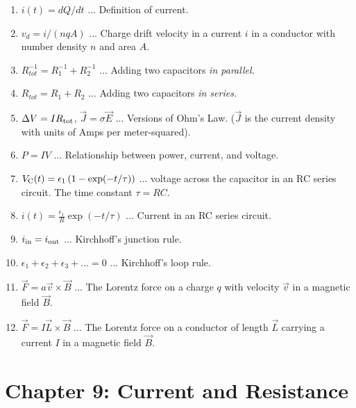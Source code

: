 \documentclass[10pt]{article}
\begin{document}
\begin{enumerate}
\item $i(t) = dQ/dt$ ... Definition of current.
\item $v_d = i/(nqA)$ ... Charge drift velocity in a current $i$ in a conductor with number density $n$ and area $A$.
\item $R_{tot}^{-1} = R_1^{-1} + R_2^{-1}$ ... Adding two capacitors \textit{in parallel.}
\item $R_{tot} = R_1 + R_2$ ... Adding two capacitors \textit{in series.}
\item $\Delta V = I R_{\rm tot}$, $\vec{J} = \sigma \vec{E}$ ... Versions of Ohm's Law. ($\vec{J}$ is the current density with units of Amps per meter-squared).
\item $P = I V$ ... Relationship between power, current, and voltage.
\item $V_{\rm C}(t) = \epsilon_1 \left(1 - \exp(-t/\tau)\right)$ ... voltage across the capacitor in an RC series circuit.  The time constant $\tau = RC$.
\item $i(t) = \frac{\epsilon_1}{R} \exp(-t/\tau)$ ... Current in an RC series circuit.
\item $i_{\rm in} = i_{\rm out}$ ... Kirchhoff's junction rule.
\item $\epsilon_1 + \epsilon_2 + \epsilon_3 + ... = 0$ ... Kirchhoff's loop rule.
\item $\vec{F} = a\vec{v} \times \vec{B}$ ... The Lorentz force on a charge $q$ with velocity $\vec{v}$ in a magnetic field $\vec{B}$.
\item $\vec{F} = I\vec{L} \times \vec{B}$ ... The Lorentz force on a conductor of length $\vec{L}$ carrying a current $I$ in a magnetic field $\vec{B}$.
\end{enumerate}

\clearpage

\section{Chapter 9: Current and Resistance}
\end{document}
